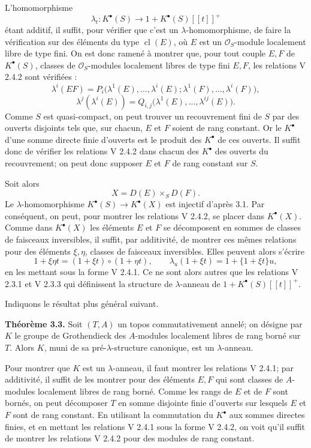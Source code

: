 \documentclass[11pt]{article}
\newcommand{\cl}{\operatorname{cl}}
\begin{document}
L'homomorphisme
\[
  \lambda_t:K^\bullet(S)\longrightarrow 1+K^\bullet(S)[[t]]^+
\]
étant additif, il suffit, pour vérifier que c'est un \(\lambda\)-homomorphisme, de faire la vérification sur des éléments du type \(\cl(E)\), où \(E\) est un \(\mathcal O_S\)-module localement libre de type fini. On est donc ramené à montrer que, pour tout couple \(E,F\) de \(K^\bullet(S)\), classes de \(\mathcal O_S\)-modules localement libres de type fini \(E,F\), les relations V 2.4.2 sont vérifiées :
\[
  \lambda^i(EF)=P_i\bigl(\lambda^1(E),\ldots,\lambda^i(E);\lambda^1(F),\ldots,\lambda^i(F)\bigr),
\]
\[
  \lambda^j(\lambda^i(E))=Q_{i,j}\bigl(\lambda^1(E),\ldots,\lambda^{ij}(E)\bigr).
\]
Comme \(S\) est quasi-compact, on peut trouver un recouvrement fini de \(S\) par des ouverts disjoints tels que, sur chacun, \(E\) et \(F\) soient de rang constant. Or le \(K^\bullet\) d'une somme directe finie d'ouverts est le produit des \(K^\bullet\) de ces ouverts. Il suffit donc de vérifier les relations V 2.4.2 dans chacun des \(K^\bullet\) des ouverts du recouvrement; on peut donc supposer \(E\) et \(F\) de rang constant sur \(S\).

Soit alors
\[
  X=D(E)\times_S D(F).
\]
Le \(\lambda\)-homomorphisme \(K^\bullet(S)\to K^\bullet(X)\) est injectif d'après 3.1. Par conséquent, on peut, pour montrer les relations V 2.4.2, se placer dans \(K^\bullet(X)\). Comme dans \(K^\bullet(X)\) les éléments \(E\) et \(F\) se décomposent en sommes de classes de faisceaux inversibles, il suffit, par additivité, de montrer ces mêmes relations pour des éléments \(\xi,\eta\), classes de faisceaux inversibles. Elles peuvent alors s'écrire
\[
  1+\xi\eta t=(1+\xi t)\circ(1+\eta t),
  \qquad
  \lambda_u(1+\xi t)=1+\{1+\xi t\}u,
\]
en les mettant sous la forme V 2.4.1. Ce ne sont alors autres que les relations V 2.3.1 et V 2.3.3 qui définissent la structure de \(\lambda\)-anneau de \(1+K^\bullet(S)[[t]]^+\).

Indiquons le résultat plus général suivant.

\textbf{Théorème 3.3.} Soit \((T,A)\) un topos commutativement annelé; on désigne par \(K\) le groupe de Grothendieck des \(A\)-modules localement libres de rang borné sur \(T\). Alors \(K\), muni de sa pré-\(\lambda\)-structure canonique, est un \(\lambda\)-anneau.

Pour montrer que \(K\) est un \(\lambda\)-anneau, il faut montrer les relations V 2.4.1; par additivité, il suffit de les montrer pour des éléments \(E,F\) qui sont classes de \(A\)-modules localement libres de rang borné. Comme les rangs de \(E\) et de \(F\) sont bornés, on peut décomposer \(T\) en somme disjointe finie d'ouverts sur lesquels \(E\) et \(F\) sont de rang constant. En utilisant la commutation du \(K^\bullet\) aux sommes directes finies, et en mettant les relations V 2.4.1 sous la forme V 2.4.2, on voit qu'il suffit de montrer les relations V 2.4.2 pour des modules de rang constant.
\end{document}
